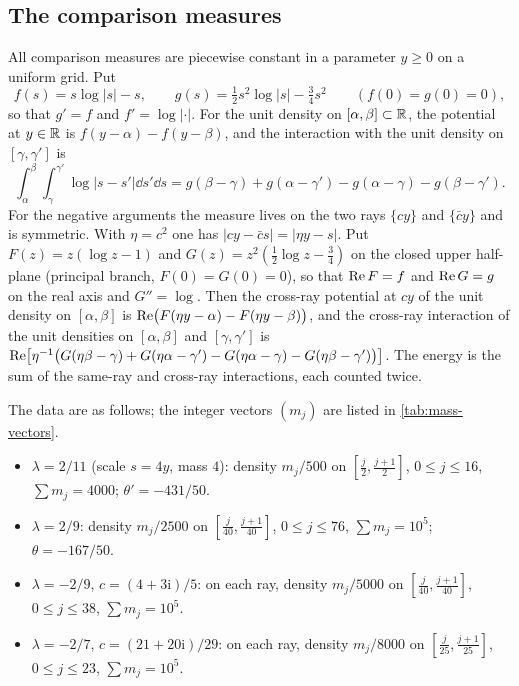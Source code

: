 \subsection{The comparison measures}\label{sec:cert-measures}
All comparison measures are piecewise constant in a parameter $y\ge0$ on a uniform grid. Put
\[
f(s)=s\log|s|-s,\qquad g(s)=\tfrac12s^2\log|s|-\tfrac34s^2\qquad(f(0)=g(0)=0),
\]
so that $g'=f$ and $f'=\log|\cdot|$. For the unit density on $[\alpha,\beta]\subset\mathbb{R}$, the potential at $y\in\mathbb{R}$ is $f(y-\alpha)-f(y-\beta)$, and the interaction with the unit density on $[\gamma,\gamma']$ is
\[
\int_\alpha^\beta\!\!\int_\gamma^{\gamma'}\log|s-s'|\dd s'\dd s=g(\beta-\gamma)+g(\alpha-\gamma')-g(\alpha-\gamma)-g(\beta-\gamma').
\]
For the negative arguments the measure lives on the two rays $\{cy\}$ and $\{\bar cy\}$ and is symmetric. With $\eta=c^2$ one has $|cy-\bar cs|=|\eta y-s|$. Put $F(z)=z(\log z-1)$ and $G(z)=z^2(\frac12\log z-\frac34)$ on the closed upper half-plane (principal branch, $F(0)=G(0)=0$), so that $\operatorname{Re} F=f$ and $\operatorname{Re} G=g$ on the real axis and $G''=\log$. Then the cross-ray potential at $cy$ of the unit density on $[\alpha,\beta]$ is $\operatorname{Re}\bigl(F(\eta y-\alpha)-F(\eta y-\beta)\bigr)$, and the cross-ray interaction of the unit densities on $[\alpha,\beta]$ and $[\gamma,\gamma']$ is $\operatorname{Re}\bigl[\eta^{-1}\bigl(G(\eta\beta-\gamma)+G(\eta\alpha-\gamma')-G(\eta\alpha-\gamma)-G(\eta\beta-\gamma')\bigr)\bigr]$. The energy is the sum of the same-ray and cross-ray interactions, each counted twice.

The data are as follows; the integer vectors $(m_j)$ are listed in \cref{tab:mass-vectors}.
\begin{itemize}
\item $\lambda=2/11$ (scale $s=4y$, mass $4$): density $m_j/500$ on $[\frac j2,\frac{j+1}2]$, $0\le j\le16$, $\sum m_j=4000$; $\theta'=-431/50$.
\item $\lambda=2/9$: density $m_j/2500$ on $[\frac j{40},\frac{j+1}{40}]$, $0\le j\le76$, $\sum m_j=10^5$; $\theta=-167/50$.
\item $\lambda=-2/9$, $c=(4+3\mathrm i)/5$: on each ray, density $m_j/5000$ on $[\frac j{40},\frac{j+1}{40}]$, $0\le j\le38$, $\sum m_j=10^5$.
\item $\lambda=-2/7$, $c=(21+20\mathrm i)/29$: on each ray, density $m_j/8000$ on $[\frac j{25},\frac{j+1}{25}]$, $0\le j\le23$, $\sum m_j=10^5$.
\end{itemize}

